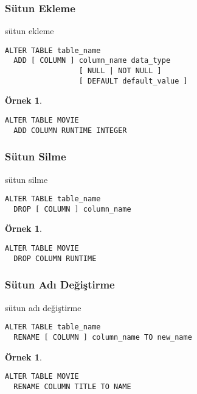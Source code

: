 \documentclass[dvipsnames]{beamer}
\theoremstyle{definition}
\theoremstyle{example}
\newtheorem{ornek}[theorem]{Örnek}
\theoremstyle{plain}
\begin{document}
\begin{frame}[fragile]
  \frametitle{Sütun Ekleme}

  \begin{block}{sütun ekleme}
    \begin{lstlisting}
ALTER TABLE table_name
  ADD [ COLUMN ] column_name data_type
                 [ NULL | NOT NULL ]
                 [ DEFAULT default_value ]
    \end{lstlisting}
  \end{block}

  \pause
  \medskip
  \begin{ornek}
    \begin{lstlisting}
ALTER TABLE MOVIE
  ADD COLUMN RUNTIME INTEGER
    \end{lstlisting}
  \end{ornek}
\end{frame}

\begin{frame}[fragile]
  \frametitle{Sütun Silme}

  \begin{block}{sütun silme}
    \begin{lstlisting}
ALTER TABLE table_name
  DROP [ COLUMN ] column_name
    \end{lstlisting}
  \end{block}

  \pause
  \medskip
  \begin{ornek}
    \begin{lstlisting}
ALTER TABLE MOVIE
  DROP COLUMN RUNTIME
    \end{lstlisting}
  \end{ornek}
\end{frame}

\begin{frame}[fragile]
  \frametitle{Sütun Adı Değiştirme}

  \begin{block}{sütun adı değiştirme}
    \begin{lstlisting}
ALTER TABLE table_name
  RENAME [ COLUMN ] column_name TO new_name
    \end{lstlisting}
  \end{block}

  \pause
  \medskip
  \begin{ornek}
    \begin{lstlisting}
ALTER TABLE MOVIE
  RENAME COLUMN TITLE TO NAME
    \end{lstlisting}
  \end{ornek}
\end{frame}
\end{document}
